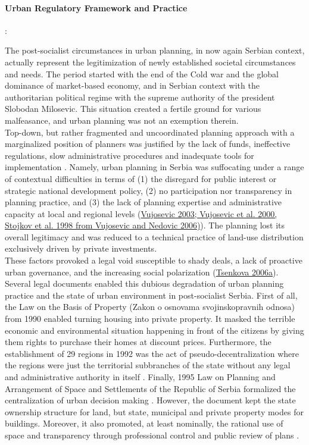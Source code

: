 \documentclass[11pt]{report}
\begin{document}
\paragraph{Urban Regulatory Framework and Practice}:

The post-socialist circumstances in urban planning, in now again Serbian context, actually represent the legitimization of newly established societal circumstances and needs.
The period started with the end of the Cold war and the global dominance of market-based economy, and in Serbian context with the authoritarian political regime with the supreme authority of the president Slobodan Milosevic. This  situation  created a fertile  ground  for various malfeasance, and urban planning was not an exemption therein.
\\

Top-down, but rather fragmented and uncoordinated planning approach with a marginalized position of planners was justified by the lack of funds, 
ineffective regulations, slow administrative procedures and inadequate tools for implementation
\href{}{\citealt{peric_evolution_2016}}. 
Namely, urban planning in Serbia was suffocating under a range of contextual difficulties in terms of  (1) the disregard for public interest or strategic national development policy, (2) no participation nor transparency in planning practice, and (3) the lack of planning expertise and administrative capacity at local and regional levels (\href{}{Vujosevic  2003;  Vujosevic et  al. 2000, Stojkov et al. 1998 from Vujosevic and Nedovic 2006)}).
The planning lost its overall legitimacy and was reduced to a technical practice of land-use distribution exclusively driven by private investments. 
\\
These factors provoked a legal void susceptible to shady deals, a lack of proactive urban governance, and the increasing social polarization (\href{}{Tsenkova 2006a}). 
Several legal documents enabled this dubious degradation of urban planning practice and the state of urban environment in post-socialist Serbia.
First of all, the Law on the Basis of Property (Zakon o osnovama svojinskopravnih odnosa) from 1990 enabled turning housing into private property. It masked the terrible economic and environmental situation happening in front of the citizens by giving them rights to purchase their homes at discount prices. 
Furthermore, the establishment of 29 regions in 1992 was the act of pseudo-decentralization where the regions were just the territorial subbranches of the state without any legal and administrative authority in itself \href{}{\citealt{vujosevic_regionalizam_2015}}.
Finally, 1995 Law on Planning and Arrangement of Space and Settlements of the Republic of Serbia formalized the centralization of urban decision making \href{}{\citealt{nedovic-budic_mornings_2011}}. However, the document kept the state ownership structure for land, but state, municipal and private property modes for buildings. Moreover, it also promoted, at least nominally, the rational use of space and transparency through professional control and public review of plans \cite{adjustment of planning practice nedovic budic 2001}.
\\    
  
\end{document}
